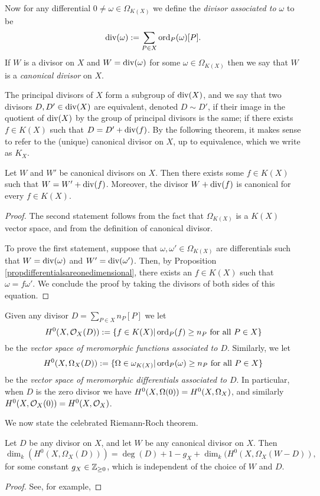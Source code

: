 Now for any differential $0 \neq \omega \in \Omega_{K(X)}$ we define the \emph{divisor associated to $\omega$} to be
    \[
    \operatorname{div}(\omega) := \sum_{P \in X} \operatorname{ord}_P(\omega)[P].
    \]
If $W$ is a divisor on $X$ and $W = \operatorname{div}(\omega)$ for some $ \omega \in \Omega_{K(X)}$ then we say that $W$ is a \emph{canonical divisor} on $X$.

The principal divisors of $X$ form a subgroup of $\operatorname{div}(X)$, and we say that two divisors $D, D' \in \operatorname{div}(X)$ are equivalent, denoted $D \sim D'$, if their image in the quotient of $\operatorname{div}(X)$ by the group of principal divisors is the same; \ie if there exists $f \in K(X)$ such that $ D = D' + \operatorname{div}(f)$.
By the following theorem, it makes sense to refer to the (unique) canonical divisor on $X$, up to equivalence, which we write as $K_X$.

    \begin{thm}
    Let $W$ and $W'$ be canonical divisors on $X$.
    Then there exists some $f \in K(X)$ such that $W = W' + \operatorname{div}(f)$.
    Moreover, the divisor $W + \operatorname{div}(f)$ is canonical for every $f \in K(X)$.
    \end{thm}
    \begin{proof}
    The second statement follows from the fact that $\Omega_{K(X)}$ is a $K(X)$ vector space, and from the definition of canonical divisor.


    To prove the first statement, suppose that $\omega, \omega' \in \Omega_{K(X)}$ are differentials such that $W = \operatorname{div}(\omega)$ and $W' = \operatorname{div}(\omega')$.
    Then, by Proposition \ref{propdifferentialsareonedimensional}, there exists an $f \in K(X)$ such that $\omega = f \omega'$.
    We conclude the proof by taking the divisors of both sides of this equation.
    \end{proof}

Given any divisor $D = \sum_{P \in X} n_P[P]$ we let
    \[
    H^0(X,{\cal O}_X(D)) : = \{ f \in K(X) | \operatorname{ord}_P(f) \geq n_P\ \text{for all}\ P \in X\}
    \]
be the \emph{vector space of meromorphic functions associated to $D$}.
Similarly, we let 
    \[
    H^0(X,\Omega_X(D)) :  = \{ \Omega \in \omega_{K(X)} | \ord_P(\omega) \geq n_P \ \text{for all} \ P \in X\}
    \]
be the \emph{vector space of meromorphic differentials associated to $D$}.
In particular, when $D$ is the zero divisor we have $H^0(X,\Omega(0)) = {H^0(X,\Omega_X)}$, and similarly $H^0(X,{\cal O}_X(0)) = H^0(X,{\cal O}_X)$.

We now state the celebrated Riemann-Roch theorem.

    \begin{thm}
    Let $D$ be any divisor on $X$, and let $W$ be any canonical divisor on $X$.
    Then
        \[
        \dim_k(H^0(X,\Omega_X(D))) = \deg(D) + 1 - g_X + \dim_k(H^0(X,\Omega_X(W-D)), 
        \]
    for some constant $g_X \in {\mathbb Z}_{\geq 0}$, which is independent of the choice of $W$ and $D$.
    \end{thm}
    \begin{proof}
    See, for example, 
    \end{proof}

